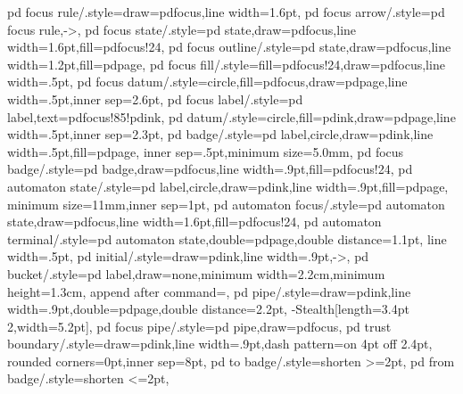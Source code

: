 {  pd focus rule/.style={draw=pdfocus,line width=1.6pt},
  pd focus arrow/.style={pd focus rule,->},
  pd focus state/.style={pd state,draw=pdfocus,line width=1.6pt,fill=pdfocus!24},
  pd focus outline/.style={pd state,draw=pdfocus,line width=1.2pt,fill=pdpage},
  pd focus fill/.style={fill=pdfocus!24,draw=pdfocus,line width=.5pt},
  pd focus datum/.style={circle,fill=pdfocus,draw=pdpage,line width=.5pt,inner sep=2.6pt},
  pd focus label/.style={pd label,text=pdfocus!85!pdink},
%
  pd datum/.style={circle,fill=pdink,draw=pdpage,line width=.5pt,inner sep=2.3pt},
  pd badge/.style={pd label,circle,draw=pdink,line width=.5pt,fill=pdpage,
    inner sep=.5pt,minimum size=5.0mm},
  pd focus badge/.style={pd badge,draw=pdfocus,line width=.9pt,fill=pdfocus!24},
  pd automaton state/.style={pd label,circle,draw=pdink,line width=.9pt,fill=pdpage,
    minimum size=11mm,inner sep=1pt},
  pd automaton focus/.style={pd automaton state,draw=pdfocus,line width=1.6pt,fill=pdfocus!24},
  pd automaton terminal/.style={pd automaton state,double=pdpage,double distance=1.1pt,
    line width=.5pt},
  pd initial/.style={draw=pdink,line width=.9pt,->},
  pd bucket/.style={pd label,draw=none,minimum width=2.2cm,minimum height=1.3cm,
    append after command={}},
  pd pipe/.style={draw=pdink,line width=.9pt,double=pdpage,double distance=2.2pt,
    -{Stealth[length=3.4pt 2,width=5.2pt]}},
  pd focus pipe/.style={pd pipe,draw=pdfocus},
  pd trust boundary/.style={draw=pdink,line width=.9pt,dash pattern=on 4pt off 2.4pt,
    rounded corners=0pt,inner sep=8pt},
  pd to badge/.style={shorten >=2pt},
  pd from badge/.style={shorten <=2pt},
}

